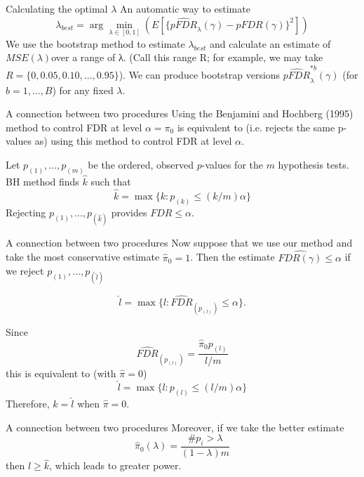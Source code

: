 \documentclass{beamer}
\begin{document}
\begin{frame}[t]{Calculating the optimal $\lambda$}\vspace{10pt}
An automatic way to estimate 
$$\lambda_{best} = \arg \min_{\lambda \in [0,1]}(E[\{\hat{pFDR}_\lambda(\gamma)-pFDR(\gamma)\}^2]) $$
We use the bootstrap method to estimate $\lambda_{best}$ and calculate an estimate of $MSE(\lambda)$over a range of λ. (Call this range R; for example, we may take $R=\{0,0.05,0.10,...,0.95\}$). We can produce bootstrap versions $\hat{pFDR}_\lambda^{*b}(\gamma)$ (for $b=1,...,B$) for any fixed $\lambda$.
\end{frame}

\begin{frame}[t]{A connection between two procedures}\vspace{10pt}
Using the Benjamini and Hochberg (1995) method to control FDR at level $\alpha=\pi_0$ is equivalent to (i.e. rejects the same p-values as) using this method to control FDR at level $\alpha$.

Let $p_{(1)},...,p_{(m)}$ be the ordered, observed $p$-values for the $m$ hypothesis tests. BH method finds $\hat{k}$ such that
$$ \hat{k}= \max\{k:p_{(k)}\leq (k/m)\alpha\}$$
Rejecting $p_{(1)},...,p_{(\hat{k})}$ provides $FDR \leq \alpha$.
\end{frame}

\begin{frame}[t]{A connection between two procedures}\vspace{10pt}
Now suppose that we use our method and take the most conservative estimate $\hat{\pi}_0=1$. Then the estimate $\hat{FDR(\gamma)}\leq \alpha$ if we reject $p_{(1)},...,p_{(\hat{l})}$

$$  \hat{l}= \max\{l:\hat{FDR}_{(p_{(l)})}\leq \alpha\}.$$

Since 
$$ \hat{FDR}_{(p_{(l)})} = \frac{\hat{\pi}_0p_{(l)}}{l/m}$$
this is equivalent to (with $\hat{\pi}=0$)
$$ \hat{l}= \max\{l:p_{(l)}\leq (l/m)\alpha\}$$
Therefore, $\hat{k}= \hat{l}$ when $\hat{\pi}=0$.
\end{frame}

\begin{frame}[t]{A connection between two procedures}\vspace{10pt}
Moreover, if we take the better estimate
$$ \hat{\pi}_0(\lambda) = \frac{\#p_i > \lambda}{(1-\lambda)m}$$ then $\hat{l}\geq \hat{k}$, which leads to greater power.
\end{frame}
\end{document}
